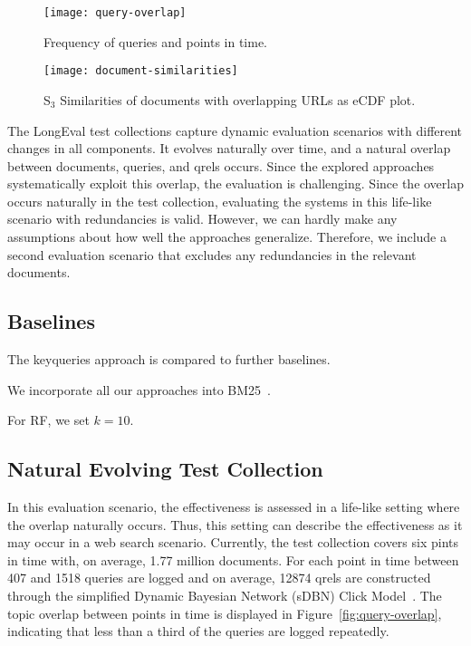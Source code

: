 \begin{figure}[t]
    \begin{minipage}{.49\textwidth}
        \texttt{[image: query-overlap]}
        \vspace{-4ex}
        \caption{Frequency of queries and points in time.}
        \label{fig:query-overlap}
    \end{minipage}
    \hfill    
    \begin{minipage}{.49\textwidth}
        \texttt{[image: document-similarities]}
        \vspace{-4ex}
        \caption{S$_{3}$ Similarities of documents with overlapping URLs as eCDF plot.}
        \label{fig:document-similarities}
    \end{minipage}
\end{figure}






The LongEval test collections capture dynamic evaluation scenarios with different changes in all components. It evolves naturally over time, and a natural overlap between documents, queries, and qrels occurs. Since the explored approaches systematically exploit this overlap, the evaluation is challenging. Since the overlap occurs naturally in the test collection, evaluating the systems in this life-like scenario with redundancies is valid. However, we can hardly make any assumptions about how well the approaches generalize. Therefore, we include a second evaluation scenario that excludes any redundancies in the relevant documents.

  
\subsection{Baselines}
The keyqueries approach is compared to further baselines. 

We incorporate all our approaches into BM25~\cite{robertson:1994}.

For RF, we set $k=10$.


\subsection{Natural Evolving Test Collection}
In this evaluation scenario, the effectiveness is assessed in a life-like setting where the overlap naturally occurs. Thus, this setting can describe the effectiveness as it may occur in a web search scenario. Currently, the test collection covers six pints in time with, on average, 1.77 million documents. For each point in time between 407 and 1518 queries are logged and on average, 12874 qrels are constructed through the simplified Dynamic Bayesian Network (sDBN) Click Model~\cite{chapelle:2009}. The topic overlap between points in time is displayed in Figure~\ref{fig:query-overlap}, indicating that less than a third of the queries are logged repeatedly.

